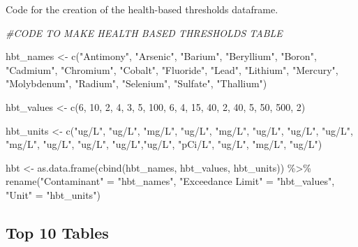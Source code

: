 \documentclass[12pt, twoside]{amherstthesis}
\newenvironment{Shaded}{\begin{snugshade}}{\end{snugshade}}
\newcommand{\CommentTok}[1]{\textcolor[rgb]{0.56,0.35,0.01}{\textit{#1}}}
\newcommand{\DecValTok}[1]{\textcolor[rgb]{0.00,0.00,0.81}{#1}}
\newcommand{\FunctionTok}[1]{\textcolor[rgb]{0.00,0.00,0.00}{#1}}
\newcommand{\NormalTok}[1]{#1}
\newcommand{\OtherTok}[1]{\textcolor[rgb]{0.56,0.35,0.01}{#1}}
\newcommand{\SpecialCharTok}[1]{\textcolor[rgb]{0.00,0.00,0.00}{#1}}
\newcommand{\StringTok}[1]{\textcolor[rgb]{0.31,0.60,0.02}{#1}}
\begin{document}
Code for the creation of the health-based thresholds dataframe.
\begin{Shaded}
\begin{Highlighting}[]
\CommentTok{\#CODE TO MAKE HEALTH BASED THRESHOLDS TABLE}

\NormalTok{hbt\_names }\OtherTok{\textless{}{-}} \FunctionTok{c}\NormalTok{(}\StringTok{"Antimony"}\NormalTok{, }\StringTok{"Arsenic"}\NormalTok{, }\StringTok{"Barium"}\NormalTok{, }\StringTok{"Beryllium"}\NormalTok{,}
               \StringTok{"Boron"}\NormalTok{, }\StringTok{"Cadmium"}\NormalTok{, }\StringTok{"Chromium"}\NormalTok{, }\StringTok{"Cobalt"}\NormalTok{, }\StringTok{"Fluoride"}\NormalTok{,}
               \StringTok{"Lead"}\NormalTok{, }\StringTok{"Lithium"}\NormalTok{, }\StringTok{"Mercury"}\NormalTok{, }\StringTok{"Molybdenum"}\NormalTok{,}
               \StringTok{"Radium"}\NormalTok{, }\StringTok{"Selenium"}\NormalTok{, }\StringTok{"Sulfate"}\NormalTok{, }\StringTok{"Thallium"}\NormalTok{)}

\NormalTok{hbt\_values }\OtherTok{\textless{}{-}} \FunctionTok{c}\NormalTok{(}\DecValTok{6}\NormalTok{, }\DecValTok{10}\NormalTok{, }\DecValTok{2}\NormalTok{, }\DecValTok{4}\NormalTok{, }
                \DecValTok{3}\NormalTok{, }\DecValTok{5}\NormalTok{, }\DecValTok{100}\NormalTok{, }\DecValTok{6}\NormalTok{, }\DecValTok{4}\NormalTok{,}
                \DecValTok{15}\NormalTok{, }\DecValTok{40}\NormalTok{, }\DecValTok{2}\NormalTok{, }\DecValTok{40}\NormalTok{, }
                \DecValTok{5}\NormalTok{, }\DecValTok{50}\NormalTok{, }\DecValTok{500}\NormalTok{, }\DecValTok{2}\NormalTok{)}

\NormalTok{hbt\_units }\OtherTok{\textless{}{-}} \FunctionTok{c}\NormalTok{(}\StringTok{"ug/L"}\NormalTok{, }\StringTok{"ug/L"}\NormalTok{, }\StringTok{"mg/L"}\NormalTok{, }\StringTok{"ug/L"}\NormalTok{, }
               \StringTok{"mg/L"}\NormalTok{, }\StringTok{"ug/L"}\NormalTok{, }\StringTok{"ug/L"}\NormalTok{, }\StringTok{"ug/L"}\NormalTok{, }\StringTok{"mg/L"}\NormalTok{,}
               \StringTok{"ug/L"}\NormalTok{, }\StringTok{"ug/L"}\NormalTok{, }\StringTok{"ug/L"}\NormalTok{,}\StringTok{"ug/L"}\NormalTok{, }
               \StringTok{"pCi/L"}\NormalTok{, }\StringTok{"ug/L"}\NormalTok{, }\StringTok{"mg/L"}\NormalTok{, }\StringTok{"ug/L"}\NormalTok{)}

\NormalTok{hbt }\OtherTok{\textless{}{-}} \FunctionTok{as.data.frame}\NormalTok{(}\FunctionTok{cbind}\NormalTok{(hbt\_names, hbt\_values, hbt\_units)) }\SpecialCharTok{\%\textgreater{}\%}
  \FunctionTok{rename}\NormalTok{(}\StringTok{"Contaminant"} \OtherTok{=} \StringTok{"hbt\_names"}\NormalTok{,}
         \StringTok{"Exceedance Limit"} \OtherTok{=} \StringTok{"hbt\_values"}\NormalTok{,}
         \StringTok{"Unit"} \OtherTok{=} \StringTok{"hbt\_units"}\NormalTok{) }
\end{Highlighting}
\end{Shaded}
\hypertarget{top-10-tables}{%
\subsection{Top 10 Tables}\label{top-10-tables}}
\end{document}
